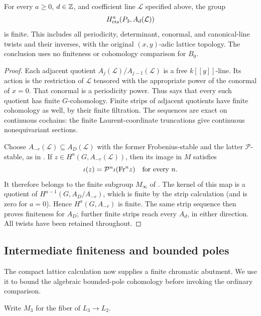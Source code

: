 \begin{proposition}
\label{h3:prop:ordinary-lattice-finiteness}
For every $a\geq0$, $d\in\mathbb Z$, and coefficient line $\mathcal L$
specified above, the group
\[
 H^a_{\mathrm{cts}}(P_3,A_d(\mathcal L))
\]
is finite.  This includes all periodicity, determinant, conormal, and
canonical-line twists and their inverses, with the original
$(x,y)$-adic lattice topology.  The conclusion uses no finiteness
or cohomology comparison for $B_0$.
\end{proposition}

\begin{proof}
Each adjacent quotient
$A_j(\mathcal L)/A_{j-1}(\mathcal L)$ is a free
$k[[y]]$-line.  Its action is the restriction of $\mathcal L$
tensored with the appropriate power of the conormal of $x=0$.
That conormal is a periodicity power.  Thus
 says that every such quotient has finite
$G$-cohomology.  Finite strips of adjacent quotients have finite
cohomology as well, by their finite filtration.  The sequences are
exact on continuous cochains: the finite Laurent-coordinate
truncations give continuous nonequivariant sections.

Choose $A_{-r}(\mathcal L)\subseteq A_D(\mathcal L)$ with the
former Frobenius-stable and the latter $\mathcal P$-stable, as in
.  If
$z\in H^a(G,A_{-r}(\mathcal L))$, then its image in $M$ satisfies
\[
 \iota(z)=\mathcal P^n\iota(\mathrm{Fr}^nz)
 \quad\hbox{for every }n.
\]
It therefore belongs to the finite subgroup $M_\infty$ of
.  The kernel of this map is a quotient of
$H^{a-1}(G,A_D/A_{-r})$, which is finite by the strip calculation
(and is zero for $a=0$).
Hence $H^a(G,A_{-r})$ is finite.  The same strip sequence then
proves finiteness for $A_D$; further finite strips reach every
$A_d$, in either direction.  All twists have been retained throughout.
\end{proof}

\subsection{Intermediate finiteness and bounded poles}
\label{h3:sec:intermediate-finiteness}

The compact lattice calculation now supplies a finite chromatic
abutment.  We use it to bound the algebraic bounded-pole cohomology
before invoking the ordinary comparison.

Write \(M_3\) for the fiber of \(L_3\to L_2\).

